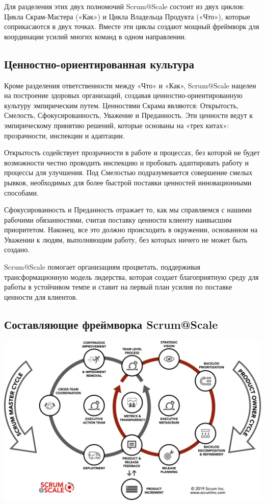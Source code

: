 \documentclass[12pt,a4paper,parskip=full]{scrartcl}
\begin{document}
Для  разделения этих двух полномочий Scrum@Scale состоит из двух циклов: Цикла Скрам-Мастера («Как») и Цикла Владельца Продукта («Что»), которые соприкасаются в двух точках. Вместе эти циклы создают мощный фреймворк для координации усилий многих команд в одном направлении.


\subsection{Ценностно-ориентированная культура}

Кроме разделения ответственности между «Что» и «Как», Scrum@Scale нацелен на построение здоровых организаций, создавая ценностно-ориентированную культуру эмпирическим путем. Ценностями Скрама являются: Открытость, Смелость, Сфокусированность, Уважение и Преданность. Эти ценности ведут к эмпирическому принятию решений, которые основаны на «трех китах»: прозрачности, инспекции и адаптации.

Открытость содействует прозрачности в работе и процессах, без которой не будет возможности честно проводить инспекцию и пробовать адаптировать работу и процессы для улучшения. Под Смелостью подразумевается совершение смелых рывков, необходимых для более быстрой поставки ценностей инновационными способами.

Сфокусированность и Преданность отражает то, как мы справляемся с нашими рабочими обязанностями, считая поставку ценности клиенту наивысшим приоритетом. Наконец, все это должно происходить в окружении, основанном на Уважении к людям, выполняющим работу, без которых ничего не может быть создано.

Scrum@Scale помогает организациям процветать, поддерживая трансформационную модель лидерства, которая создает благоприятную среду для работы в устойчивом темпе и ставит на первый план усилия по поставке ценности для клиентов.


\subsection{Составляющие фреймворка Scrum@Scale\textregistered }

\includegraphics[width=1.0\linewidth]{SMPO-Cycle.png}
\end{document}
